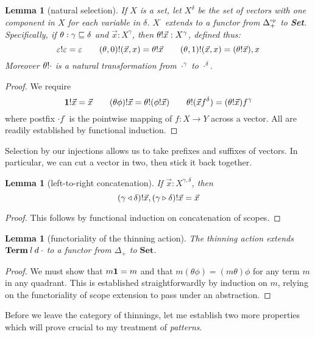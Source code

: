 \documentclass{jfp1}
\newtheorem{lemma}[theorem]{Lemma}
\newcommand{\emp}{\varepsilon}
\newcommand{\Set}{\textbf{Set}}
\newcommand{\op}[1]{#1^{\mbox{\tiny op}}}
\begin{document}
\begin{lemma}[natural selection]
  If $X$ is a set, let $X^\delta$ be the set of vectors with one
  component in $X$ for each variable in $\delta$. $X^\cdot$ extends
  to a functor from $\op{\Delta_+}$ to \Set.
  Specifically, if $\theta:\gamma\sqsubseteq\delta$ and $\vec x:X^\gamma$,
  then $\theta!\vec x : X^\gamma$, defined thus:
  \[
    \sel\emp\emp=\emp \qquad
    \sel{(\theta,0)}{(\vec x,x)} = \sel\theta{\vec x} \qquad
    \sel{(\theta,1)}{(\vec x,x)} = (\sel\theta{\vec x}),x
  \]
  Moreover $\theta!\cdot$ is a natural transformation from
  $\cdot^\gamma$ to $\cdot^\delta$.
\end{lemma}
\begin{proof}
  We require
  \[
    \mathbf{1}!\vec x = \vec x \qquad
    (\theta\phi)!\vec x = \theta!(\phi!\vec x) \qquad
    \theta!(\vec x f^\delta) = (\theta!\vec x)f^\gamma
  \]
  where postfix $\cdot f^\cdot$ is the pointwise mapping of $f:X\to Y$ across a vector.
  All are readily established by functional induction.
\end{proof}

Selection by our injections allows us to take prefixes and suffixes of
vectors. In particular, we can cut a vector in two, then stick it back
together.

\begin{lemma}[left-to-right concatenation]
  If $\vec x : X^{\gamma,\delta}$, then
  \[
    (\gamma \triangleleft \delta)!\vec x, (\gamma \triangleright \delta)!\vec x
    = \vec x
  \]
\end{lemma}
\begin{proof}
  This follows by functional induction on concatenation of scopes.
\end{proof}


\begin{lemma}[functoriality of the thinning action]
 The thinning action extends $\mathbf{Term}\:l\:d\:\cdot$ to a functor from $\Delta_+$ to $\Set$.
\end{lemma}
\begin{proof}
  We must show that $m\mathbf{1} = m$ and that $m(\theta\phi) = (m\theta)\phi$ for any term $m$ in any quadrant.
  This is established straightforwardly by induction on $m$, relying on the functoriality of scope extension
  to pass under an abstraction.
\end{proof}

Before we leave the category of thinnings, let me establish two more properties which
will prove crucial to my treatment of \emph{patterns}.
\end{document}
